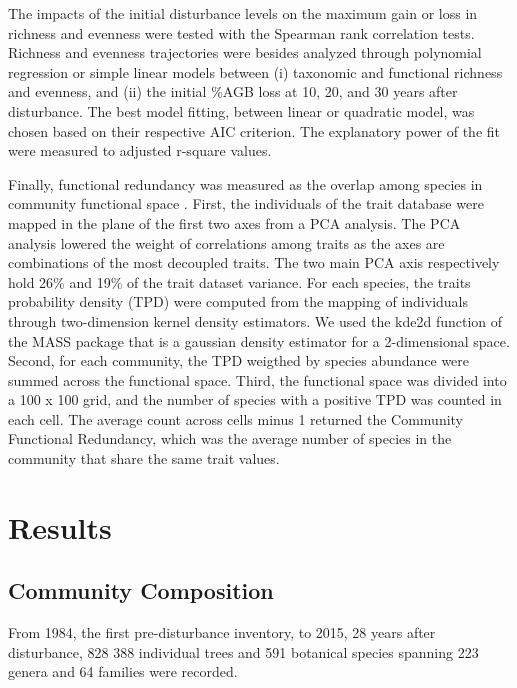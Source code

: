 \documentclass[fleqn,10pt]{ArtEcoFoG} %
\begin{document}
The impacts of the initial disturbance levels on the maximum gain or
loss in richness and evenness were tested with the Spearman rank
correlation tests. Richness and evenness trajectories were besides
analyzed through polynomial regression \color{red}or simple linear
models \color{black} between (i) taxonomic and functional richness and
evenness, and (ii) the initial \%AGB loss at 10, 20, and 30 years after
disturbance. \color{red}The best model fitting, between linear or
quadratic model, was chosen based on their respective AIC criterion. The
explanatory power of the fit were measured to adjusted r-square
values.\color{black}

Finally, functional redundancy was measured as the overlap among species
in community functional space \citep{Carmona2016}. First, the
individuals of the trait database were mapped in the plane of the first
two axes from a PCA analysis. The PCA analysis lowered the weight of
correlations among traits as the axes are combinations of the most
decoupled traits. \color{red}The two main PCA axis respectively hold
26\% and 19\% of the trait dataset variance.\color{black} For each
species, the traits probability density (TPD) were computed from the
mapping of individuals through two-dimension kernel density estimators.
\color{red} We used the kde2d function of the MASS package
\citep{MASS2002} that is a gaussian density estimator for a
2-dimensional space. \color{black} Second, for each community, the TPD
weigthed by species abundance were summed across the functional space.
Third, the functional space was divided into a 100 x 100 grid, and the
number of species with a positive TPD was counted in each cell. The
average count across cells minus 1 returned the Community Functional
Redundancy, which was the average number of species in the community
that share the same trait values.

\section{Results}\label{results}

\subsection{Community Composition}\label{community-composition}

From 1984, the first pre-disturbance inventory, to 2015, 28 years after
disturbance, 828 388 individual trees and 591 botanical species spanning
223 genera and 64 families were recorded.
\end{document}
